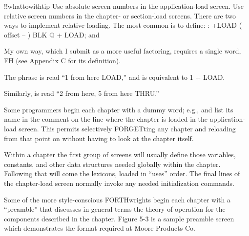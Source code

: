 !!whattowithtip{
Use absolute screen numbers in the application-load screen.  Use relative
screen numbers in the chapter- or section-load screens.
}
There are two ways to implement relative loading.  The most common is
to define:
: +LOAD  ( offset -- )  BLK @ +  LOAD;
and

My own way, which I submit as a more useful factoring, requires a single
word, FH (see Appendix C for its definition).

The phrase
is read ``1 from here LOAD,'' and is equivalent to 1 + LOAD.

Similarly,
is read ``2 from here, 5 from here THRU.''

Some programmers begin each chapter with a dummy word; e.g.,
and list its name in the comment on the line where the chapter is loaded in
the application-load screen.  This permits selectively FORGETting any
chapter and reloading from that point on without having to look at the
chapter itself.

Within a chapter the first group of screens will usually define those
variables, constants, and other data structures needed globally within
the chapter.  Following that will come the lexicons, loaded in ``uses''
order.  The final lines of the chapter-load screen normally invoke any
needed initialization commands.

Some of the more style-conscious FORTHwrights begin each
chapter with a ``preamble'' that discusses in general terms the theory of
operation for the components described in the chapter.  Figure 5-3 is a
sample preamble screen which demonstrates the format required at
Moore Products Co.

